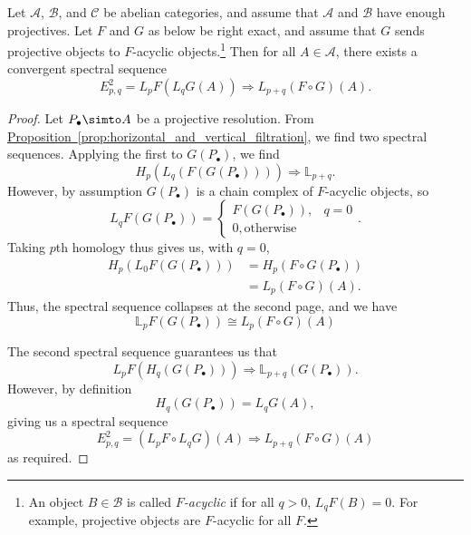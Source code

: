 \documentclass[main.tex]{subfiles}
\begin{document}
\begin{proposition}
  \label{prop:grothendieck_spectral_sequence}
  Let $\mathcal{A}$, $\mathcal{B}$, and $\mathcal{C}$ be abelian categories, and assume that $\mathcal{A}$ and $\mathcal{B}$ have enough projectives. Let $F$ and $G$ as below be right exact, and assume that $G$ sends projective objects to $F$-acyclic objects.\footnote{An object $B \in \mathcal{B}$ is called \emph{$F$-acyclic} if for all $q > 0$, $L_{q}F(B) = 0$. For example, projective objects are $F$-acyclic for all $F$.} Then for all $A \in \mathcal{A}$, there exists a convergent spectral sequence
  \begin{equation*}
    E^{2}_{p, q} = L_{p}F(L_{q}G(A)) \Longrightarrow L_{p+q}(F \circ G)(A).
  \end{equation*}
\end{proposition}
\begin{proof}
  Let $P_{\bullet} \simto A$ be a projective resolution. From \hyperref[prop:horizontal_and_vertical_filtration]{Proposition~\ref*{prop:horizontal_and_vertical_filtration}}, we find two spectral sequences. Applying the first to $G(P_{\bullet})$, we find
  \begin{equation*}
    H_{p}(L_{q}(F(G(P_{\bullet})))) \Longrightarrow \mathbb{L}_{p+q}.
  \end{equation*}
  However, by assumption $G(P_{\bullet})$ is a chain complex of $F$-acyclic objects, so
  \begin{equation*}
    L_{q}F(G(P_{\bullet})) =
    \begin{cases}
      F(G(P_{\bullet})), & q = 0 \\
      0, \text{otherwise}
    \end{cases}.
  \end{equation*}
  Taking $p$th homology thus gives us, with $q = 0$,
  \begin{align*}
    H_{p}(L_{0}F(G(P_{\bullet}))) &= H_{p}(F \circ G(P_{\bullet})) \\
    &= L_{p}(F \circ G)(A).
  \end{align*}
  Thus, the spectral sequence collapses at the second page, and we have
  \begin{equation*}
    \mathbb{L}_{p}F(G(P_{\bullet})) \cong L_{p}(F \circ G)(A)
  \end{equation*}

  The second spectral sequence guarantees us that
  \begin{equation*}
    L_{p}F(H_{q}(G(P_{\bullet}))) \Longrightarrow \mathbb{L}_{p+q}(G(P_{\bullet})).
  \end{equation*}
  However, by definition
  \begin{equation*}
    H_{q}(G(P_{\bullet})) = L_{q}G(A),
  \end{equation*}
  giving us a spectral sequence
  \begin{equation*}
    E^{2}_{p,q} = (L_{p}F \circ L_{q}G)(A) \Longrightarrow L_{p+q}(F \circ G)(A)
  \end{equation*}
  as required.
\end{proof}
\end{document}
